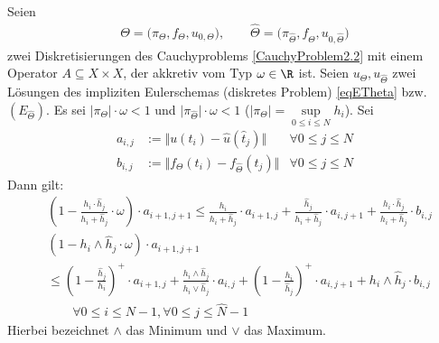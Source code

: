 \begin{lemma}
Seien 
\begin{align*}
\Theta=\big(\pi_\Theta,f_\Theta,u_{0,\Theta}\big),\qquad
\hat{\Theta}=\big(\pi_{\hat{\Theta}},f_{\hat{\Theta}},u_{0,\hat{\Theta}}\big)
\end{align*}
zwei Diskretisierungen des Cauchyproblems \eqref{CauchyProblem2.2} mit einem Operator $A\subseteq X\times X$, der akkretiv vom Typ $\omega\in\R$ ist. 
Seien $u_\Theta,u_{\hat{\Theta}}$ zwei Lösungen des impliziten Eulerschemas (diskretes Problem) \eqref{eqETheta} bzw. $(E_{\hat{\Theta}})$.
Es sei $\big|\pi_\Theta\big|\cdot\omega<1$ und $\big|\pi_{\hat{\Theta}}\big|\cdot\omega<1$ ($\big|\pi_\Theta\big|=\sup\limits_{0\leq i\leq N} h_i$). Sei
\begin{align*}
a_{i,j}&:=\Big\Vert u(t_i)-\hat{u}(\hat{t}_j)\Big\Vert &\forall 0\leq j\leq N\\
b_{i,j}&:=\Big\Vert f_\Theta(t_i)-f_{\hat{\Theta}}(t_j)\Big\Vert &\forall 0\leq j\leq N
\end{align*}
Dann gilt:
\begin{align*}
&\left(1-\frac{h_i\cdot\hat{h}_j}{h_i+\hat{h}_j}\cdot\omega\right)\cdot a_{i+1,j+1}
\leq\frac{h_i}{h_i+\hat{h}_j}\cdot a_{i+1,j}+\frac{\hat{h}_j}{h_i+\hat{h}_j}\cdot a_{i,j+1}+\frac{h_i\cdot\hat{h}_j}{h_i+\hat{h}_j}\cdot b_{i,j}\\
&\left(1-h_i\wedge\hat{h}_j\cdot\omega\right)\cdot a_{i+1,j+1}\\
&\leq\left(1-\frac{\hat{h}_j}{h_i}\right)^+\cdot a_{i+1,j}+\frac{h_i\wedge\hat{h}_j}{h_i\vee\hat{h}_j}\cdot a_{i,j}+\left(1-\frac{h_i}{\hat{h}_j}\right)^+\cdot a_{i,j+1}+h_i\wedge\hat{h}_j\cdot b_{i,j}\\
&\qquad\forall 0\leq i\leq N-1,\forall 0\leq j\leq\hat{N}-1
\end{align*}
Hierbei bezeichnet $\wedge$ das Minimum und $\vee$ das Maximum.
\end{lemma}
